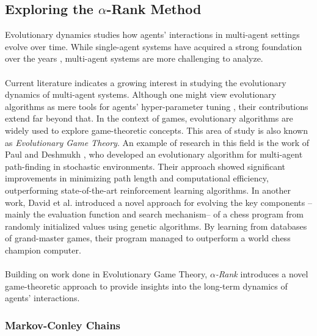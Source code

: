 \subsection{Exploring the \texorpdfstring{$\alpha$}{alpha}-Rank Method}

\begin{flushleft}

    Evolutionary dynamics studies how agents' interactions in multi-agent settings evolve over time. While single-agent systems have acquired a strong foundation over the years \cite{10.5555/2831071.2831085}, multi-agent systems are more challenging to analyze.\\~\\

    Current literature indicates a growing interest in studying the evolutionary dynamics of multi-agent systems. Although one might view evolutionary algorithms as mere tools for agents' hyper-parameter tuning \cite{Sinha_2023}\cite{ganapathy2020studygeneticalgorithmshyperparameter}, their contributions extend far beyond that. In the context of games, evolutionary algorithms are widely used to explore game-theoretic concepts. This area of study is also known as \emph{Evolutionary Game Theory}. An example of research in this field is the work of Paul and Deshmukh \cite{paul2022multiagentpathfinding}, who developed an evolutionary algorithm for multi-agent path-finding in stochastic environments. Their approach showed significant improvements in minimizing path length and computational efficiency, outperforming state-of-the-art reinforcement learning algorithms. In another work, David et al. \cite{David_2014} introduced a novel approach for evolving the key components --mainly the evaluation function and search mechanism-- of a chess program from randomly initialized values using genetic algorithms. By learning from databases of grand-master games, their program managed to outperform a world chess champion computer.\\~\\
    
    Building on work done in Evolutionary Game Theory, \emph{$\alpha$-Rank} \cite{omidshafiei2019alpharank} introduces a novel game-theoretic approach to provide insights into the long-term dynamics of agents' interactions. 

    \subsubsection{Markov-Conley Chains}


\end{flushleft}
